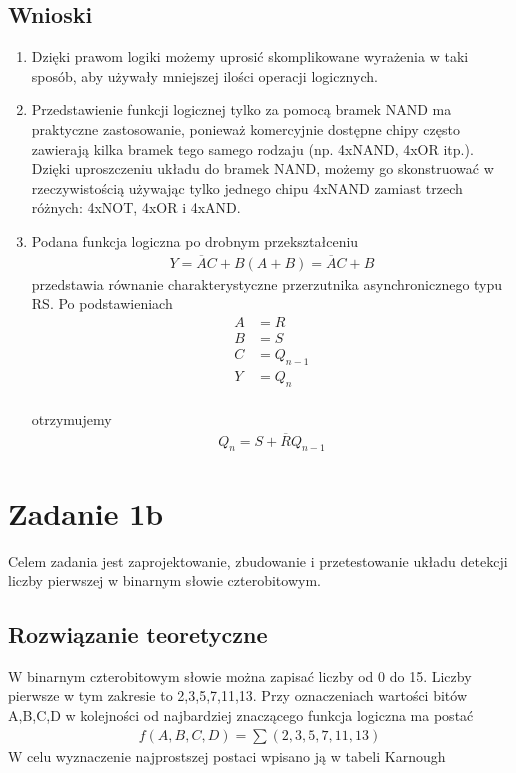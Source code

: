 \documentclass[12pt,a4paper,openright]{mwrep}
\begin{document}
\section{Wnioski}
\begin{enumerate}
    \item Dzięki prawom logiki możemy uprosić skomplikowane wyrażenia
    w taki sposób, aby używały mniejszej ilości operacji logicznych.
    \item Przedstawienie funkcji logicznej tylko za pomocą bramek NAND
    ma praktyczne zastosowanie, ponieważ komercyjnie dostępne chipy często
    zawierają kilka bramek tego samego rodzaju (np. 4xNAND, 4xOR itp.).
    Dzięki uproszczeniu układu do bramek NAND, możemy go skonstruować
    w rzeczywistością używając tylko jednego chipu 4xNAND zamiast
    trzech różnych: 4xNOT, 4xOR i 4xAND.
    \item Podana funkcja logiczna po drobnym przekształceniu
    \begin{align*}
        Y = \overline{A}C + B(A + B) = \overline{A}C + B
    \end{align*}
    przedstawia równanie charakterystyczne przerzutnika 
    asynchronicznego typu RS. 
    Po podstawieniach
    \begin{align*}
        A &= R\\
        B &= S\\
        C &= Q_{n-1}\\
        Y &= Q_{n}\\
    \end{align*}
        
    otrzymujemy
    \begin{align*}
        Q_{n} = S + \overline{R}Q_{n-1}
    \end{align*}
\end{enumerate}
\chapter{Zadanie 1b}
Celem zadania jest zaprojektowanie, zbudowanie i przetestowanie 
układu detekcji liczby pierwszej w binarnym słowie czterobitowym.
\section{Rozwiązanie teoretyczne}
W binarnym czterobitowym słowie można zapisać liczby od 0 do 15.
Liczby pierwsze w tym zakresie to 2,3,5,7,11,13.
Przy oznaczeniach wartości bitów A,B,C,D w kolejności od najbardziej znaczącego funkcja logiczna ma postać
\begin{align*}
    f(A,B,C,D) = \sum(2,3,5,7,11,13)
\end{align*}
W celu wyznaczenie najprostszej postaci wpisano ją w tabeli Karnough
    
\end{document}
